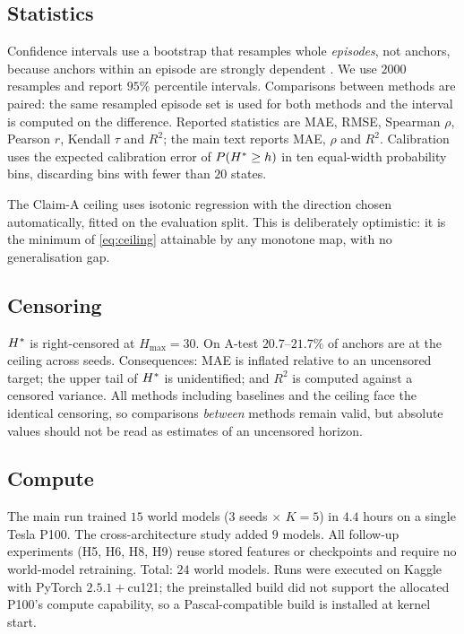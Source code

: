 \subsection{Statistics}

Confidence intervals use a bootstrap that resamples whole \emph{episodes}, not anchors, because
anchors within an episode are strongly dependent \citep{efron1993bootstrap}. We use $2000$
resamples and report $95\%$ percentile intervals. Comparisons between methods are paired: the
same resampled episode set is used for both methods and the interval is computed on the
difference. Reported statistics are MAE, RMSE, Spearman $\rho$, Pearson $r$, Kendall $\tau$ and
$R^2$; the main text reports MAE, $\rho$ and $R^2$. Calibration uses the expected calibration
error of $P(H^{*} \ge h)$ in ten equal-width probability bins, discarding bins with fewer than
$20$ states.

The Claim-A ceiling uses isotonic regression \citep{barlow1972isotonic} with the direction
chosen automatically, fitted on the evaluation split. This is deliberately optimistic: it is
the minimum of \eqref{eq:ceiling} attainable by any monotone map, with no generalisation gap.

\subsection{Censoring}

$H^{*}$ is right-censored at $H_{\max} = 30$. On A-test $20.7$--$21.7\%$ of anchors are at the
ceiling across seeds. Consequences: MAE is inflated relative to an uncensored target; the upper
tail of $H^{*}$ is unidentified; and $R^2$ is computed against a censored variance. All
methods including baselines and the ceiling face the identical censoring, so comparisons
\emph{between} methods remain valid, but absolute values should not be read as estimates of an
uncensored horizon.

\subsection{Compute}

The main run trained $15$ world models ($3$ seeds $\times$ $K=5$) in $4.4$ hours on a single
Tesla P100. The cross-architecture study added $9$ models. All follow-up experiments (H5, H6,
H8, H9) reuse stored features or checkpoints and require no world-model retraining. Total:
$24$ world models. Runs were executed on Kaggle with PyTorch $2.5.1{+}$cu121; the preinstalled
build did not support the allocated P100's compute capability, so a Pascal-compatible build is
installed at kernel start.
